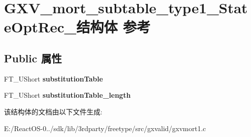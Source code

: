 \hypertarget{struct_g_x_v__mort__subtable__type1___state_opt_rec__}{}\section{G\+X\+V\+\_\+mort\+\_\+subtable\+\_\+type1\+\_\+\+State\+Opt\+Rec\+\_\+结构体 参考}
\label{struct_g_x_v__mort__subtable__type1___state_opt_rec__}
\subsection*{Public 属性}
\begin{DoxyCompactItemize}
\item 
\mbox{\label{struct_g_x_v__mort__subtable__type1___state_opt_rec___a76933f244faef4878fb63377b6155262}} 
F\+T\+\_\+\+U\+Short {\bfseries substitution\+Table}
\item 
\mbox{\label{struct_g_x_v__mort__subtable__type1___state_opt_rec___acbf534c30305ac2a68315932cebd0ea5}} 
F\+T\+\_\+\+U\+Short {\bfseries substitution\+Table\+\_\+length}
\end{DoxyCompactItemize}


该结构体的文档由以下文件生成\+:\begin{DoxyCompactItemize}
\item 
E\+:/\+React\+O\+S-\/0../sdk/lib/3rdparty/freetype/src/gxvalid/gxvmort1.\+c\end{DoxyCompactItemize}
